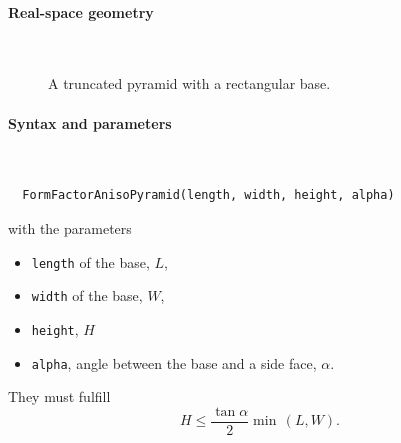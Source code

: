 
 \label{SAnisoPyramid}

\paragraph{Real-space geometry}\strut\\

\begin{figure}[H]
\hfill
{}
\hfill
{}
\hfill
{}
\hfill
\caption{A truncated pyramid with a rectangular base.}
\end{figure}

\FloatBarrier

\paragraph{Syntax and parameters}\strut\\[-2ex plus .2ex minus .2ex]
\begin{lstlisting}
  FormFactorAnisoPyramid(length, width, height, alpha)
\end{lstlisting}
with the parameters
\begin{itemize}
\item \texttt{length} of the base, $L$,
\item \texttt{width} of the base, $W$,
\item \texttt{height}, $H$
\item \texttt{alpha}, angle between the base and a side face, $\alpha$.
\end{itemize}
They must fulfill
\begin{displaymath}
  H \le \frac{\tan\alpha}{2} \min\,(L,W).
\end{displaymath}


